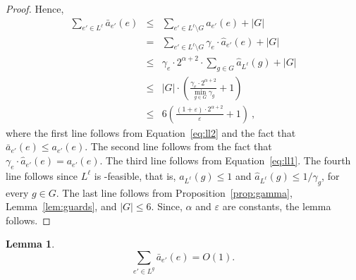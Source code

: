 \documentclass[11pt]{article}
\newenvironment{proof sketch}{\noindent {\bf Proof sketch:} }{\hfill \qed}
\newtheorem{lemma}{Lemma}
\newcommand{\eps}{\varepsilon}
\newcommand{\sinr}{\text{\sc{sinr}}}
\begin{document}
\begin{proof}
Hence,
\begin{eqnarray*}
     \sum_{e' \in L ^{\ell}} {\bar a}_{e'}(e) &\leq & \sum_{e' \in L^{\ell} \setminus G} a_{e'}(e) + |G|\\
                & = & \sum_{e' \in L^{\ell} \setminus G} \gamma_e \cdot {\hat a}_{e'}(e) + |G|\\
                & \leq & \gamma_e \cdot 2^{\alpha+2} \cdot \sum_{g \in G} \hat{a}_{L^{\ell}} (g) + |G|\\
                & \leq &   |G| \cdot\left(\frac {\gamma_e \cdot 2^{\alpha+2}}{\min_{g\in G}\gamma_g} + 1 \right) \\
                & \leq &   6 \left(\frac {(1+\eps)\cdot 2^{\alpha+2}}{\eps} + 1 \right)\:,
\end{eqnarray*}
where the first line follows from Equation~\ref{eq:ll2} and the fact that ${\bar a}_{e'}(e) \leq  a_{e'}(e)$.
The second line follows from the fact that $\gamma_e \cdot {\hat a}_{e'}(e) = a_{e'}(e)$.
The third line follows from Equation~\ref{eq:ll1}.
The fourth line follows since $L^{\ell}$ is \sinr-feasible, that is,  $a_{L^{\ell}} (g)\leq 1$ and $\hat a_{L^{\ell}} (g)\leq 1/\gamma_g$, for every $g \in G$. The last line follows from Proposition~\ref{prop:gamma}, Lemma~\ref{lem:guards}, and $|G| \leq 6$.
Since, $\alpha$ and $\eps$ are constants, the lemma follows.
\end{proof}
\begin{lemma}\label{lemma:out degree}
  $$\sum_{e' \in L^g } {\bar a}_{e'}(e) = O(1).$$
\end{lemma}
\end{document}
